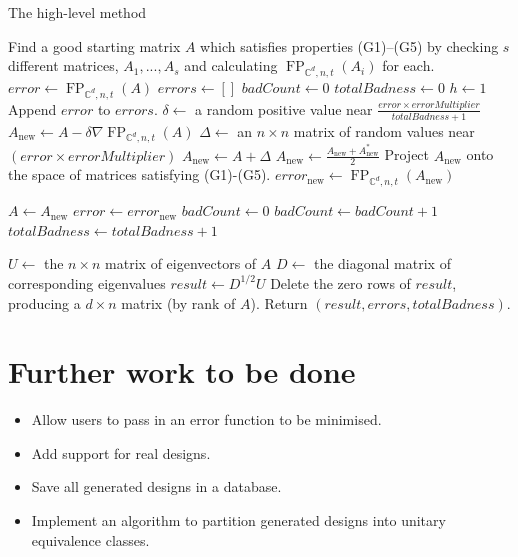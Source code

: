 \documentclass{article}
\newcommand{\C}{\mathbb{C}}
\DeclareMathOperator{\FP}{FP}
\theoremstyle{definition}
\begin{document}
  \begin{algorithm}
    \caption{The high-level method}\label{alg:high_level}
    \begin{algorithmic}[1]
        \State Find a good starting matrix $ A $ which satisfies properties (G1)--(G5) by checking $ s $ different
               matrices, $ A_1,...,A_s $ and calculating $\FP_{\C^d,n,t}(A_i)$ for each. \label{line:seed}
        \State $ error \gets \FP_{\C^d,n,t}(A) $
        \State $ errors \gets [] $
        \State $ badCount \gets 0 $
        \State $ totalBadness \gets 0 $
        \State $ h \gets 1 $
         \label{line:tf_iter}
          \State Append $ error $ to $ errors $.
            \State $ \delta \gets $ a random positive value near $ \frac{error \times errorMultiplier}{totalBadness + 1} $
            \State $ A_{\mathrm{new}} \gets A - \delta \nabla\FP_{\C^d,n,t}(A) $
          \Else
            \State $ \Delta \gets $ an $ n \times n $ matrix of random values near $ (error \times errorMultiplier) $
            \State $ A_{\mathrm{new}} \gets A + \Delta $
          \EndIf
          \State $ A_{\mathrm{new}} \gets \frac{A_{\mathrm{new}} + A_{\mathrm{new}}^*}{2} $\label{line:make_hermitian}
          \State Project $ A_{\mathrm{new}} $ onto the space of matrices satisfying (G1)-(G5).
          \State $ error_\mathrm{new} \gets \FP_{\C^d,n,t}(A_{\mathrm{new}}) $
          
            \State $ A \gets A_\mathrm{new} $
            \State $ error \gets error_\mathrm{new} $
            \State $ badCount \gets 0 $
          \Else
            \State $ badCount \gets badCount + 1 $
            \State $ totalBadness \gets totalBadness + 1 $
          \EndIf
        \EndWhile
        
        \State $ U \gets $ the $ n \times n $ matrix of eigenvectors of $ A $
        \State $ D \gets $ the diagonal matrix of corresponding eigenvalues
        \State $ result \gets D^{1/2}U $
        \State Delete the zero rows of $ result $, producing a $ d \times n $ matrix (by rank of $ A $).
        \State Return $ (result, errors, totalBadness) $.
      \EndProcedure
    \end{algorithmic}
  \end{algorithm}

  \section{Further work to be done}
  \begin{itemize}
    \item Allow users to pass in an error function to be minimised.
    \item Add support for real designs.
    \item Save all generated designs in a database.
    \item Implement an algorithm to partition generated designs into unitary equivalence classes.
  \end{itemize}

  \printbibliography
\end{document}
